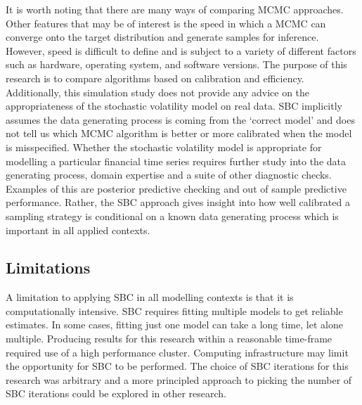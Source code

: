 \documentclass[12pt, a4paper]{article}
\begin{document}
It is worth noting that there are many ways of comparing MCMC approaches. Other features that may be of interest is the speed in which a MCMC can converge onto the target distribution and generate samples for inference. However, speed is difficult to define and is subject to a variety of different factors such as hardware, operating system, and software versions. The purpose of this research is to compare algorithms based on calibration and efficiency. Additionally, this simulation study does not provide any advice on the appropriateness of the stochastic volatility model on real data. SBC implicitly assumes the data generating process is coming from the `correct model' and does not tell us which MCMC algorithm is better or more calibrated when the model is misspecified. Whether the stochastic volatility model is appropriate for modelling a particular financial time series requires further study into the data generating process, domain expertise and a suite of other diagnostic checks. Examples of this are posterior predictive checking and out of sample predictive performance. Rather, the SBC approach gives insight into how well calibrated a sampling strategy is conditional on a known data generating process which is important in all applied contexts.  


\subsection{Limitations}
A limitation to applying SBC in all modelling contexts is that it is computationally intensive. SBC requires fitting multiple models to get reliable estimates. In some cases, fitting just one model can take a long time, let alone multiple. Producing results for this research within a reasonable time-frame required use of a high performance cluster. Computing infrastructure may limit the opportunity for SBC to be performed. The choice of SBC iterations for this research was arbitrary and a more principled approach to picking the number of SBC iterations could be explored in other research.
\end{document}
